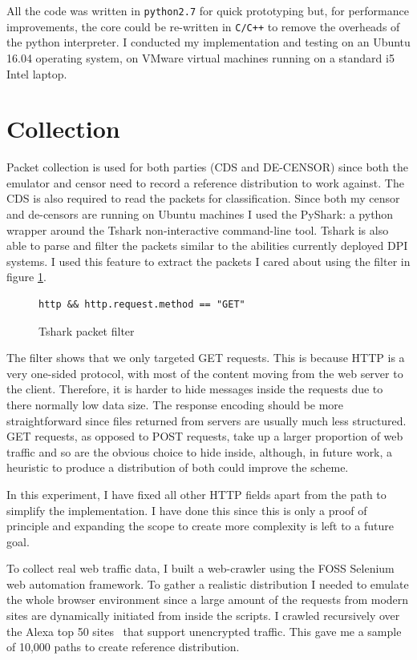 \documentclass[ %
                    author={Samuel Russell},
                supervisor={Prof. Bogdan Warinschi},
                    degree={MEng},
                     title={Innocuous Ciphertexts},
                  subtitle={The DE-CENSOR Scheme},
                      type={Research},
                      year={2018} ]{dissertation}
\begin{document}
All the code was written in \texttt{python2.7} for quick prototyping but, for performance improvements, the core could be re-written in \texttt{C/C++} to remove the overheads of the python interpreter. I conducted my implementation and testing on an Ubuntu 16.04 operating system, on VMware virtual machines running on a standard i5 Intel laptop.

\section{Collection}

Packet collection is used for both parties (CDS and DE-CENSOR) since both the emulator and censor need to record a reference distribution to work against. The CDS is also required to read the packets for classification. Since both my censor and de-censors are running on Ubuntu machines I used the PyShark: a python wrapper around the Tshark non-interactive command-line tool. Tshark is also able to parse and filter the packets similar to the abilities currently deployed DPI systems. I used this feature to extract the packets I cared about using the filter in figure \ref{fig:filter}.

\begin{figure}[h]
\begin{verbatim}
http && http.request.method == "GET"
\end{verbatim}
\caption{Tshark packet filter}
\label{fig:filter}
\end{figure}

The filter shows that we only targeted GET requests. This is because HTTP is a very one-sided protocol, with most of the content moving from the web server to the client.
Therefore, it is harder to hide messages inside the requests due to there normally low data size. The response encoding should be more straightforward since files returned from servers are usually much less structured. GET requests, as opposed to POST requests, take up a larger proportion of web traffic and so are the obvious choice to hide inside, although, in future work, a heuristic to produce a distribution of both could improve the scheme.

In this experiment, I have fixed all other HTTP fields apart from the path to simplify the implementation. I have done this since this is only a proof of principle and expanding the scope to create more complexity is left to a future goal.

To collect real web traffic data, I built a web-crawler using the FOSS Selenium web automation framework. To gather a realistic distribution I needed to emulate the whole browser environment since a large amount of the requests from modern sites are dynamically initiated from inside the scripts.
I crawled recursively over the Alexa top 50 sites~\cite{alexa} that support unencrypted traffic. This gave me a sample of 10,000 paths to create reference distribution.
\end{document}
